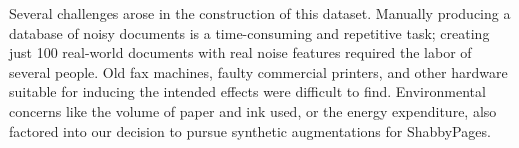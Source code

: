 \documentclass[runningheads]{llncs}
\begin{document}
Several challenges arose in the construction of this dataset.
Manually producing a database of noisy documents is a time-consuming and repetitive task; creating just 100 real-world documents with real noise features required the labor of several people.
Old fax machines, faulty commercial printers, and other hardware suitable for inducing the intended effects were difficult to find. Environmental concerns like the volume of paper and ink used, or the energy expenditure, also factored into our decision to pursue synthetic augmentations for ShabbyPages.



\end{document}

